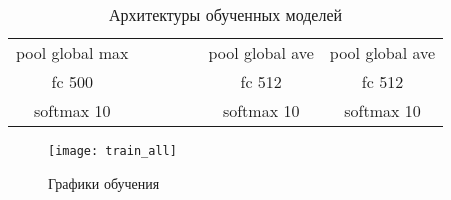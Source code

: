 \begin{table}[h]
{\begin{tabular}{|c|c|c|c|c|c|c|}
    pool global max  &                   &                    &                                                                     &                  & pool global ave   & pool global ave    \\ \cline{1-1} \cline{6-7} 
    fc 500           &                   &                    &                                                                     &                  & fc 512            & fc 512             \\
    softmax 10       &                   &                    &                                                                     &                  & softmax 10        & softmax 10         \\ \hline
    \end{tabular}
}
\caption{Архитектуры обученных моделей}
\label{models-table}
\end{table}

\begin{figure}[H]
    \centering
    \texttt{[image: train\_all]}
    \caption{Графики обучения}
    \label{fig:train_all}
\end{figure}